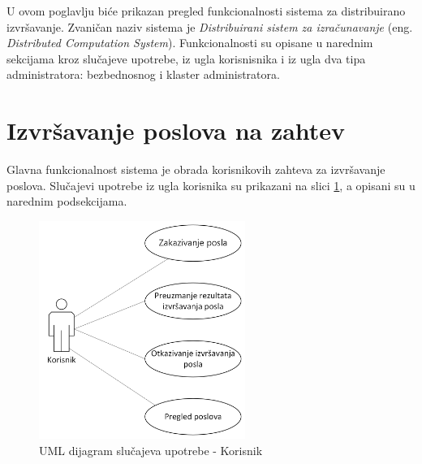\documentclass[12pt,oneside]{memoir}
\begin{document}
U ovom poglavlju biće prikazan pregled funkcionalnosti sistema za distribuirano izvršavanje. Zvaničan naziv sistema je \emph{Distribuirani sistem za izračunavanje} (eng. \emph{Distributed Computation System}).
Funkcionalnosti su opisane u narednim sekcijama kroz slučajeve upotrebe, iz ugla korisnisnika i iz ugla dva tipa administratora: bezbednosnog i klaster administratora.

\section{Izvršavanje poslova na zahtev}
Glavna funkcionalnost sistema je obrada korisnikovih zahteva za izvršavanje poslova. 
Slučajevi upotrebe iz ugla korisnika su prikazani na slici \ref{fig:slucajupotrebe_korisnik}, a opisani su u narednim podsekcijama.

\begin{figure}[!ht]
  \centering
  \label{fig:slucajupotrebe_korisnik}
  \includegraphics[width=0.6\textwidth]{./images/dijagram_slucajeva_upotrebe_korisnik.png}
  \caption{UML dijagram slučajeva upotrebe - Korisnik}
\end{figure}

\end{document}
